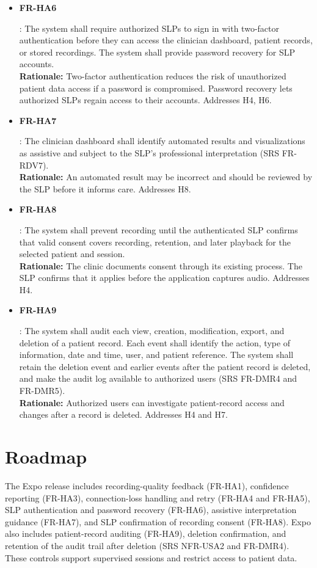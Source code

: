 \documentclass{article}
\begin{document}
\begin{itemize}
\item \hypertarget{ha:FR-HA6}{\textbf{FR-HA6}}: The system shall require authorized SLPs to sign in with two-factor authentication before they can access the clinician dashboard, patient records, or stored recordings. The system shall provide password recovery for SLP accounts.\\
\textbf{Rationale:} Two-factor authentication reduces the risk of unauthorized patient data access if a password is compromised. Password recovery lets authorized SLPs regain access to their accounts. Addresses H4, H6.

\item \hypertarget{ha:FR-HA7}{\textbf{FR-HA7}}: The clinician dashboard shall identify automated results and visualizations
as assistive and subject to the SLP's professional interpretation (SRS FR-RDV7). \\
\textbf{Rationale:} An automated result may be incorrect and should be
reviewed by the SLP before it informs care. Addresses H8.

\item \hypertarget{ha:FR-HA8}{\textbf{FR-HA8}}: The system shall prevent recording until the
authenticated SLP confirms that valid consent covers recording, retention,
and later playback for the selected patient and session.\\
\textbf{Rationale:} The clinic documents consent through its existing process.
The SLP confirms that it applies before the application captures audio. Addresses H4.

\item \hypertarget{ha:FR-HA9}{\textbf{FR-HA9}}: The system shall audit each view, creation, modification, export, and
deletion of a patient record. Each event shall identify the action, type of
information, date and time, user, and patient reference. The system shall
retain the deletion event and earlier events after the patient record is
deleted, and make the audit log available to authorized users (SRS FR-DMR4
and FR-DMR5). \\
\textbf{Rationale:} Authorized users can investigate patient-record access
and changes after a record is deleted. Addresses H4 and H7.

\end{itemize}

\section{Roadmap}

The Expo release includes recording-quality feedback (FR-HA1), confidence
reporting (FR-HA3), connection-loss handling and retry (FR-HA4 and FR-HA5),
SLP authentication and password recovery (FR-HA6), assistive interpretation
guidance (FR-HA7), and SLP confirmation of recording consent (FR-HA8).
Expo also includes patient-record auditing (FR-HA9), deletion confirmation,
and retention of the audit trail after deletion (SRS NFR-USA2 and FR-DMR4).
These controls support supervised sessions and restrict access to patient
data.
\end{document}

